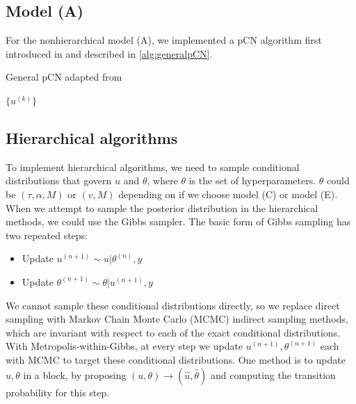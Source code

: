 \documentclass{siamart1116}
\begin{document}
    \subsection{Model (A)}
        For the nonhierarchical model (A), we implemented a pCN algorithm first introduced in \cite{BeRoStVo08} and described in \cref{alg:generalpCN}.

        \begin{algorithm}
        \caption{General pCN adapted from \cite{CoRoStWh13}}
        \label{alg:generalpCN}
        \begin{algorithmic}[1]
        \EndFor
        \State \Return $\{u^{(k)}\}$
        \end{algorithmic}
        \end{algorithm}

    \subsection{Hierarchical algorithms}
        To implement hierarchical algorithms, we need to sample conditional distributions that govern $u$ and $\theta$, where $\theta$ is the set of hyperparameters. $\theta$ could be $(\tau, \alpha, M)$ or $(v, M)$ depending on if we choose model (C) or model (E). When we attempt to sample the posterior distribution in the hierarchical methods, we could use the Gibbs sampler. The basic form of Gibbs sampling has two repeated steps:
        \begin{itemize}
        \item Update $u^{(n+1)} \sim u|\theta^{(n)}, y$
        \item Update $\theta^{(n+1)} \sim \theta|u^{(n+1)}, y$
        \end{itemize}
        We cannot sample these conditional distributions directly, so we replace direct sampling with Markov Chain Monte Carlo (MCMC) indirect sampling methods, which are invariant with respect to each of the exact conditional distributions. With Metropolis-within-Gibbs, at every step we update $u^{(n+1)}, \theta^{(n+1)}$ each with MCMC to target these conditional distributions. One method is to update $u, \theta$ in a block, by proposing $(u,\theta) \to  (\hat u, \hat \theta)$ and computing the transition probability for this step. 
\end{document}
